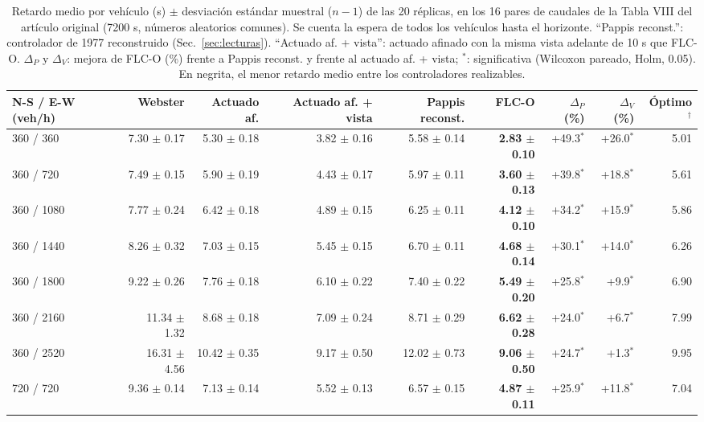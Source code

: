 \begin{table}[!t]
\centering
\caption{Retardo medio por veh\'iculo (s) $\pm$ desviaci\'on est\'andar muestral ($n-1$) de las 20 r\'eplicas, en los 16 pares de caudales de la Tabla VIII del art\'iculo original (7200 s, n\'umeros aleatorios comunes). Se cuenta la espera de todos los veh\'iculos hasta el horizonte. ``Pappis reconst.'': controlador de 1977 reconstruido (Sec.~\ref{sec:lecturas}). ``Actuado af. + vista'': actuado afinado con la misma vista adelante de 10 s que FLC-O. $\Delta_P$ y $\Delta_V$: mejora de FLC-O (\%) frente a Pappis reconst. y frente al actuado af. + vista; $^{*}$: significativa (Wilcoxon pareado, Holm, 0.05). En negrita, el menor retardo medio entre los controladores realizables.}
\label{tab:oficial}
\scriptsize
\setlength{\tabcolsep}{3pt}
\begin{tabular}{@{}lrrrrrrrr@{}}
\toprule
N-S / E-W (veh/h) & Webster & Actuado af. & Actuado af. + vista & Pappis reconst. & FLC-O & $\Delta_P$ (\%) & $\Delta_V$ (\%) & \'Optimo$^{\dagger}$ \\
\midrule
360 / 360 & 7.30 $\pm$ 0.17 & 5.30 $\pm$ 0.18 & 3.82 $\pm$ 0.16 & 5.58 $\pm$ 0.14 & \textbf{2.83 $\pm$ 0.10} & +49.3$^{*}$ & +26.0$^{*}$ & 5.01 \\
360 / 720 & 7.49 $\pm$ 0.15 & 5.90 $\pm$ 0.19 & 4.43 $\pm$ 0.17 & 5.97 $\pm$ 0.11 & \textbf{3.60 $\pm$ 0.13} & +39.8$^{*}$ & +18.8$^{*}$ & 5.61 \\
360 / 1080 & 7.77 $\pm$ 0.24 & 6.42 $\pm$ 0.18 & 4.89 $\pm$ 0.15 & 6.25 $\pm$ 0.11 & \textbf{4.12 $\pm$ 0.10} & +34.2$^{*}$ & +15.9$^{*}$ & 5.86 \\
360 / 1440 & 8.26 $\pm$ 0.32 & 7.03 $\pm$ 0.15 & 5.45 $\pm$ 0.15 & 6.70 $\pm$ 0.11 & \textbf{4.68 $\pm$ 0.14} & +30.1$^{*}$ & +14.0$^{*}$ & 6.26 \\
360 / 1800 & 9.22 $\pm$ 0.26 & 7.76 $\pm$ 0.18 & 6.10 $\pm$ 0.22 & 7.40 $\pm$ 0.22 & \textbf{5.49 $\pm$ 0.20} & +25.8$^{*}$ & +9.9$^{*}$ & 6.90 \\
360 / 2160 & 11.34 $\pm$ 1.32 & 8.68 $\pm$ 0.18 & 7.09 $\pm$ 0.24 & 8.71 $\pm$ 0.29 & \textbf{6.62 $\pm$ 0.28} & +24.0$^{*}$ & +6.7$^{*}$ & 7.99 \\
360 / 2520 & 16.31 $\pm$ 4.56 & 10.42 $\pm$ 0.35 & 9.17 $\pm$ 0.50 & 12.02 $\pm$ 0.73 & \textbf{9.06 $\pm$ 0.50} & +24.7$^{*}$ & +1.3$^{*}$ & 9.95 \\
720 / 720 & 9.36 $\pm$ 0.14 & 7.13 $\pm$ 0.14 & 5.52 $\pm$ 0.13 & 6.57 $\pm$ 0.15 & \textbf{4.87 $\pm$ 0.11} & +25.9$^{*}$ & +11.8$^{*}$ & 7.04 \\

\end{tabular}
\end{table}
